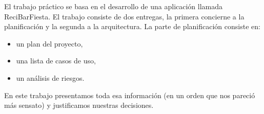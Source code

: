 El trabajo práctico se basa en el desarrollo de una aplicación llamada ReciBarFiesta. El trabajo consiste de dos entregas, la primera concierne a la planificación y la segunda a la arquitectura. La parte de planificación consiste en:
\begin{itemize}  
  \item un plan del proyecto,
  \item una lista de casos de uso,
  \item un análisis de riesgos.
\end{itemize}
En este trabajo presentamos toda esa información (en un orden que nos pareció más sensato) y justificamos nuestras decisiones.
